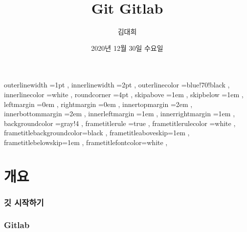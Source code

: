 \documentclass[12pt, a4paper, oneside]{book}
\let\stdsection\section
\renewcommand\section{\newpage\stdsection}
\begin{document}
	
			\dominitoc
			\doparttoc			


			\title{ Git Gitlab  }
			\author{김대희}
			\date{ 	2020년 
					12월 
					30일
					수요일
						}
			\maketitle


			\tableofcontents 		%
			\cleardoublepage
			\listoftables 			%





		 {
						outerlinewidth		=1pt			,%
						innerlinewidth		=2pt			,%
						outerlinecolor		=blue!70!black	,%
						innerlinecolor		=white 			,%
						roundcorner			=4pt			,%
						skipabove			=1em 			,%
						skipbelow			=1em 			,%
						leftmargin			=0em			,%
						rightmargin			=0em			,%
						innertopmargin		=2em 			,%
						innerbottommargin 	=2em 			,%
						innerleftmargin		=1em 			,%
						innerrightmargin		=1em 			,%
						backgroundcolor		=gray!4			,%
						frametitlerule		=true 			,%
						frametitlerulecolor	=white			,%
						frametitlebackgroundcolor=black		,%
						frametitleaboveskip=1em 			,%
						frametitlebelowskip=1em 			,%
						frametitlefontcolor=white 			,%
						}


%


	\part{ 개요  }
	\noptcrule
	\parttoc				

%										
	\section{ 깃 시작하기 }


%										
	\section{ Gitlab }
\end{document}
